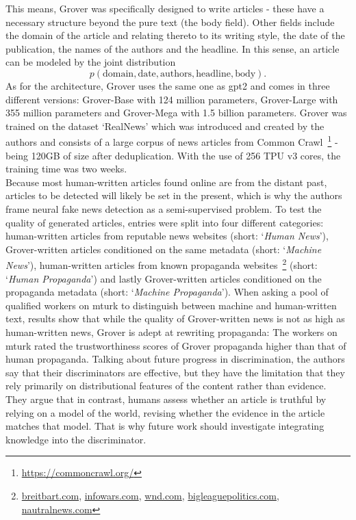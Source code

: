 This means, Grover was specifically designed to write articles - these have a necessary structure beyond the pure text (the body field). Other fields include the domain of the article and relating thereto to its writing style, the date of the publication, the names of the authors and the headline. In this sense, an article can be modeled by the joint distribution
\begin{equation}
	p(\text{domain}, \text{date}, \text{authors}, \text{headline}, \text{body}).
\end{equation}
As for the architecture, Grover uses the same one as \gls{gpt2} and comes in three different versions: Grover-Base with 124 million parameters, Grover-Large with 355 million parameters and Grover-Mega with 1.5 billion parameters. Grover was trained on the dataset `RealNews' which was introduced and created by the authors and consists of a large corpus of news articles from Common Crawl~\footnote{\url{https://commoncrawl.org/}} - being 120GB of size after deduplication. With the use of 256 TPU v3 cores, the training time was two weeks. \\
Because most human-written articles found online are from the distant past, articles to be detected will likely be set in the present, which is why the authors frame neural fake news detection as a semi-supervised problem. To test the quality of generated articles, entries were split into four different categories: human-written articles from reputable news websites (short: `\textit{Human News}'), Grover-written articles conditioned on the same metadata (short: `\textit{Machine News}'), human-written articles from known propaganda websites~\footnote{\url{breitbart.com}, \url{infowars.com}, \url{wnd.com}, \url{bigleaguepolitics.com}, \url{nautralnews.com}} (short: `\textit{Human Propaganda}') and lastly Grover-written articles conditioned on the propaganda metadata (short: `\textit{Machine Propaganda}'). When asking a pool of qualified workers on \gls{mturk} to distinguish between machine and human-written text, results show that while the quality of Grover-written news is not as high as human-written news, Grover is adept at rewriting propaganda: The workers on \gls{mturk} rated the trustworthiness scores of Grover propaganda higher than that of human propaganda. Talking about future progress in discrimination, the authors say that their discriminators are effective, but they have the limitation that they rely primarily on distributional features of the content rather than evidence. They argue that in contrast, humans assess whether an article is truthful by relying on a model of the world, revising whether the evidence in the article matches that model. That is why future work should investigate integrating knowledge into the discriminator.
